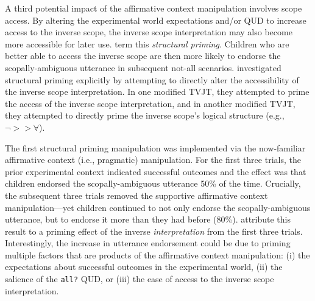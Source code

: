 \documentclass[10pt,a4paper]{article}
\begin{document}
A third potential impact of the affirmative context manipulation involves scope access.
By  altering the experimental world expectations and/or QUD to increase access to the inverse scope, the inverse scope interpretation may also become more accessible for later use.   term this \textit{structural priming}.  
Children who are better able to access the inverse scope are then more likely to endorse the scopally-ambiguous utterance in subsequent {not-all} scenarios.
\citeauthor{viau2010priming} investigated structural priming explicitly by attempting to 
directly alter the accessibility of the inverse scope interpretation. %
In one modified TVJT, they attempted to prime the access of the inverse scope interpretation, and in another modified TVJT, they attempted to directly prime the inverse scope's logical structure (e.g., $\neg>>\forall$).

The first structural priming manipulation was implemented via the now-familiar %
affirmative context (i.e., pragmatic) manipulation. For the first three trials, the  prior experimental context indicated successful outcomes and the effect was that children endorsed the scopally-ambiguous utterance 50\% of the time. Crucially, the subsequent three trials removed the supportive affirmative context manipulation---yet children continued to not only endorse the scopally-ambiguous utterance, but to endorse it more than they had before (80\%).  
 attribute this result to a priming effect of the inverse \emph{interpretation} from the first three trials. 
Interestingly, the increase in utterance endorsement could be due to priming multiple  factors that are products of the affirmative context manipulation:
(i) the expectations about successful outcomes in the experimental world, 
(ii)  the salience of the \texttt{all?} QUD, or
(iii)  the ease of access to the inverse scope interpretation. 
  
\end{document}
